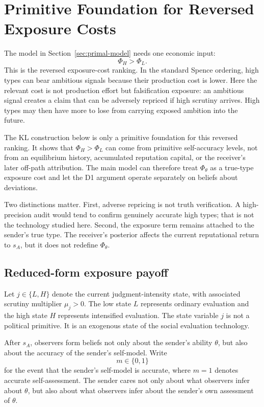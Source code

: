 
\section{Primitive Foundation for Reversed Exposure Costs}
\label{sec:psychological-exposure}

The model in Section~\ref{sec:primal-model} needs one economic input:
\[
\Phi_H>\Phi_L.
\]
This is the reversed exposure-cost ranking. In the standard Spence ordering, high types can bear ambitious signals because their production cost is lower. Here the relevant cost is not production effort but falsification exposure: an ambitious signal creates a claim that can be adversely repriced if high scrutiny arrives. High types may then have more to lose from carrying exposed ambition into the future.

The KL construction below is only a primitive foundation for this reversed ranking. It shows that \(\Phi_H>\Phi_L\) can come from primitive self-accuracy levels, not from an equilibrium history, accumulated reputation capital, or the receiver's later off-path attribution. The main model can therefore treat \(\Phi_\theta\) as a true-type exposure cost and let the D1 argument operate separately on beliefs about deviations.

Two distinctions matter. First, adverse repricing is not truth verification. A high-precision audit would tend to confirm genuinely accurate high types; that is not the technology studied here. Second, the exposure term remains attached to the sender's true type. The receiver's posterior affects the current reputational return to \(s_A\), but it does not redefine \(\Phi_\theta\).

\subsection{Reduced-form exposure payoff}

Let $j\in\{L,H\}$ denote the current judgment-intensity state, with associated scrutiny multiplier $\mu_j>0$. The low state $L$ represents ordinary evaluation and the high state $H$ represents intensified evaluation. The state variable $j$ is not a political primitive. It is an exogenous state of the social evaluation technology.

After $s_A$, observers form beliefs not only about the sender's ability $\theta$, but also about the accuracy of the sender's self-model. Write
\[
m\in\{0,1\}
\]
for the event that the sender's self-model is accurate, where $m=1$ denotes accurate self-assessment. The sender cares not only about what observers infer about $\theta$, but also about what observers infer about the sender's own assessment of $\theta$.

